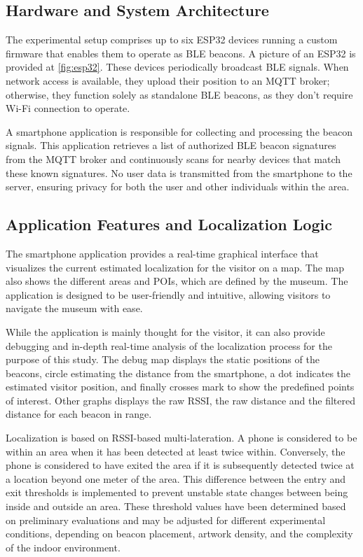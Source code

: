 \subsection{Hardware and System Architecture}

The experimental setup comprises up to six ESP32 devices running a custom firmware that enables them to operate as BLE beacons. A picture of an ESP32 is provided at \autoref{fig:esp32}. These devices periodically broadcast BLE signals. When network access is available, they upload their position to an MQTT broker; otherwise, they function solely as standalone BLE beacons, as they don't require Wi-Fi connection to operate.

A smartphone application is responsible for collecting and processing the beacon signals. This application retrieves a list of authorized BLE beacon signatures from the MQTT broker and continuously scans for nearby devices that match these known signatures. No user data is transmitted from the smartphone to the server, ensuring privacy for both the user and other individuals within the area.

\subsection{Application Features and Localization Logic}

The smartphone application provides a real-time graphical interface that visualizes the current estimated localization for the visitor on a map. The map also shows the different areas and POIs, which are defined by the museum. The application is designed to be user-friendly and intuitive, allowing visitors to navigate the museum with ease. 

While the application is mainly thought for the visitor, it can also provide debugging and in-depth real-time analysis of the localization process for the purpose of this study. The debug map displays the static positions of the beacons, circle estimating the distance from the smartphone, a dot indicates the estimated visitor position, and finally crosses mark to show the predefined points of interest. Other graphs displays the raw RSSI, the raw distance and the filtered distance for each beacon in range.

Localization is based on RSSI-based multi-lateration. A phone is considered to be within an area when it has been detected at least twice within. Conversely, the phone is considered to have exited the area if it is subsequently detected twice at a location beyond one meter of the area. This difference between the entry and exit thresholds is implemented to prevent unstable state changes between being inside and outside an area. These threshold values have been determined based on preliminary evaluations and may be adjusted for different experimental conditions, depending on beacon placement, artwork density, and the complexity of the indoor environment.

